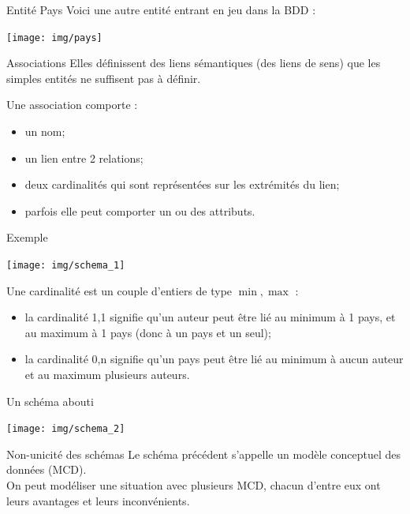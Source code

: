 \documentclass[10pt]{beamer}
\begin{document}
\begin{frame}{Entité Pays}
Voici une autre entité entrant en jeu dans la BDD :
\begin{center}
\texttt{[image: img/pays]}
\end{center}

\end{frame}
\begin{frame}{Associations}
Elles définissent des \alert{liens sémantiques} (des liens de sens)	 que les simples entités ne suffisent pas à définir.\\\pause

Une association comporte :\pause
\begin{itemize}
	\item	un nom;\pause
    \item 	un lien entre 2 relations;\pause
	\item	deux cardinalités qui sont représentées sur les extrémités du lien;\pause
    \item 	parfois elle peut comporter un ou des attributs.
\end{itemize}
\end{frame}
\begin{frame}{Exemple}
	\begin{center}
    \texttt{[image: img/schema\_1]}
    \end{center}\pause
    Une cardinalité est un couple d'entiers \og de type $\min, \max$\fg{} :\pause
    \begin{itemize}
    	\item	la cardinalité 1,1 signifie qu'un auteur peut être lié au minimum à 1 pays, et au maximum à 1 pays (donc à un pays et un seul);\pause
    	\item	la cardinalité 0,n signifie qu'un pays peut être lié au minimum à aucun auteur et au maximum plusieurs auteurs.\pause
    \end{itemize}
\end{frame}
\begin{frame}{Un schéma abouti}
\begin{center}
 \texttt{[image: img/schema\_2]}
 \end{center}
\end{frame}
\begin{frame}{Non-unicité des schémas}
    Le schéma précédent s'appelle un modèle conceptuel des données (MCD).\\\pause
	On peut modéliser une situation avec plusieurs MCD, chacun d'entre eux ont leurs avantages et leurs inconvénients.\pause
\end{frame}
\end{document}
